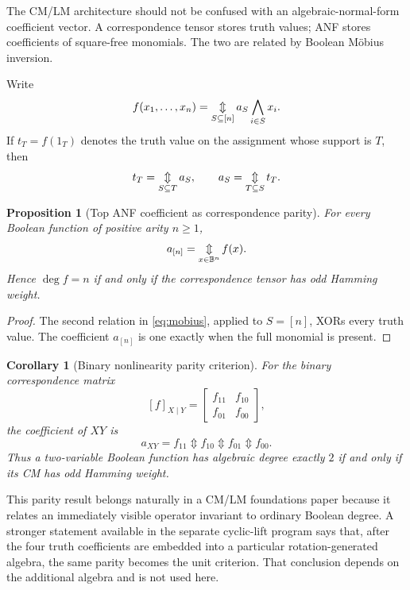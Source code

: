 \documentclass[11pt]{article}
\newtheorem{proposition}[theorem]{Proposition}
\newtheorem{corollary}[theorem]{Corollary}
\theoremstyle{definition}
\theoremstyle{remark}
\newcommand{\B}{\mathbb B}
\newcommand{\xor}{\mathbin{\Updownarrow}}
\newcommand{\bigxor}{\mathop{\Updownarrow}\displaylimits}
\begin{document}
The CM/LM architecture should not be confused with an algebraic-normal-form coefficient vector.  A correspondence tensor stores truth values; ANF stores coefficients of square-free monomials.  The two are related by Boolean M\"obius inversion.

Write
\begin{equation}
 f(x_1,\ldots,x_n)
 =\bigxor_{S\subseteq[n]}
 a_S\bigwedge_{i\in S}x_i.
 \label{eq:anf}
\end{equation}
If $t_T=f(1_T)$ denotes the truth value on the assignment whose support is $T$, then
\begin{equation}
 t_T=\bigxor_{S\subseteq T}a_S,
 \qquad
 a_S=\bigxor_{T\subseteq S}t_T.
 \label{eq:mobius}
\end{equation}

\begin{proposition}[Top ANF coefficient as correspondence parity]
For every Boolean function of positive arity $n\ge1$,
\begin{equation}
 a_{[n]}=\bigxor_{x\in\B^n}f(x).
 \label{eq:topparity}
\end{equation}
Hence $\deg f=n$ if and only if the correspondence tensor has odd Hamming weight.
\end{proposition}
\begin{proof}
The second relation in \eqref{eq:mobius}, applied to $S=[n]$, XORs every truth value.  The coefficient $a_{[n]}$ is one exactly when the full monomial is present.
\end{proof}

\begin{corollary}[Binary nonlinearity parity criterion]
For the binary correspondence matrix
\[
 [f]_{X\mid Y}=\begin{bmatrix}f_{11}&f_{10}\\f_{01}&f_{00}\end{bmatrix},
\]
the coefficient of $XY$ is
\[
 a_{XY}=f_{11}\xor f_{10}\xor f_{01}\xor f_{00}.
\]
Thus a two-variable Boolean function has algebraic degree exactly $2$ if and only if its CM has odd Hamming weight.
\end{corollary}

This parity result belongs naturally in a CM/LM foundations paper because it relates an immediately visible operator invariant to ordinary Boolean degree.  A stronger statement available in the separate cyclic-lift program says that, after the four truth coefficients are embedded into a particular rotation-generated algebra, the same parity becomes the unit criterion.  That conclusion depends on the additional algebra and is not used here.
\end{document}
